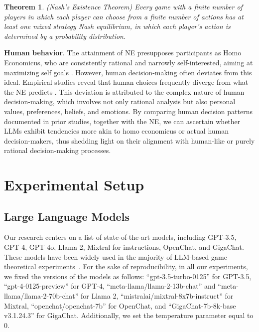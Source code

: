 \documentclass{article}
\newtheorem{theorem}{Theorem}[section]
\begin{document}
\begin{theorem} \label{thm:nash}
(Nash’s Existence Theorem) Every game with a finite number of players in which
each player can choose from a finite number of actions has at least one mixed strategy Nash equilibrium, in which each player’s action is determined by a probability distribution.
\end{theorem}

\textbf{Human behavior}. The attainment of NE presupposes participants as Homo Economicus, who are
consistently rational and narrowly self-interested, aiming at maximizing self goals \cite{persky1995}.
However, human decision-making often deviates from this ideal. Empirical studies reveal that human choices frequently diverge from what the NE predicts \cite{nagel1995}. This deviation is attributed to the complex nature of human decision-making, which involves not only rational analysis but also
personal values, preferences, beliefs, and emotions. By comparing human decision patterns documented in prior studies, together with the NE, we can ascertain whether LLMs exhibit tendencies more akin to homo economicus or actual human decision-makers, thus shedding light on their alignment with human-like or purely rational decision-making processes.

\FloatBarrier

\newpage
\section{Experimental Setup}
\label{app: setup}




\subsection{Large Language Models}
\label{app: llms}

Our research centers on a list of state-of-the-art models, including GPT-3.5, GPT-4, GPT-4o, Llama 2, Mixtral for instructions, OpenChat, and GigaChat. These models have been widely used in the majority of LLM-based game theoretical experiments~\cite{akata2023playing, brookins}. For the sake of reproducibility, in all our experiments, we fixed the versions of the models as follows: ``gpt-3.5-turbo-0125'' for GPT-3.5, ``gpt-4-0125-preview'' for GPT-4, ``meta-llama/llama-2-13b-chat'' and ``meta-llama/llama-2-70b-chat'' for Llama 2, ``mistralai/mixtral-8x7b-instruct'' for Mixtral, ``openchat/openchat-7b'' for OpenChat, and ``GigaChat-7b-8k-base v3.1.24.3'' for GigaChat. Additionally, we set the temperature parameter equal to 0.
\end{document}
